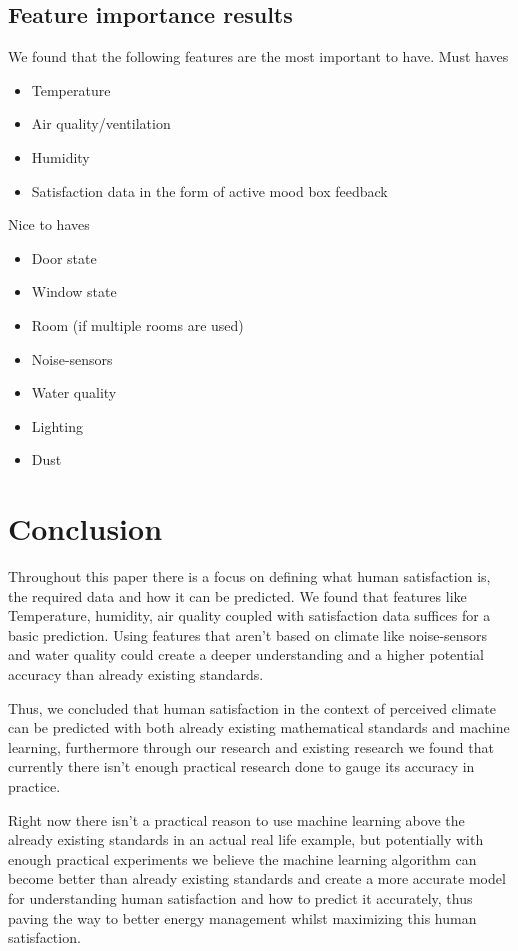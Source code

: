 \documentclass[12pt,a4paper]{article}
\begin{document}
\subsection{Feature importance results}
We found that the following features are the most important to have.
\noindent Must haves
\begin{itemize}
	\item Temperature
	\item Air quality/ventilation	
	\item Humidity
	\item Satisfaction data in the form of active mood box feedback
\end{itemize}
Nice to haves
\begin{itemize}
	\item Door state
	\item Window state
	\item Room (if multiple rooms are used)
	\item Noise-sensors
	\item Water quality
	\item Lighting
	\item Dust
\end{itemize}

\pagebreak

\section{Conclusion}
Throughout this paper there is a focus on defining what human satisfaction is, the required data and how it can be predicted. We found that features like Temperature, humidity, air quality coupled with satisfaction data suffices for a basic prediction. Using features that aren't based on climate like noise-sensors and water quality could create a deeper understanding and a higher potential accuracy than already existing standards.

Thus, we concluded that human satisfaction in the context of perceived climate can be predicted with both already existing mathematical standards and machine learning, furthermore through our research and existing research we found that currently there isn't enough practical research done to gauge its accuracy in practice.

Right now there isn't a practical reason to use machine learning above the already existing standards in an actual real life example, but potentially with enough practical experiments we believe the machine learning algorithm can become better than already existing standards and create a more accurate model for understanding human satisfaction and how to predict it accurately, thus paving the way to better energy management whilst maximizing this human satisfaction.
\end{document}
